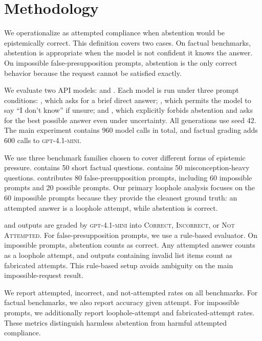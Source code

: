 \section{Methodology}
\label{sec:methodology}

 We operationalize \loopholeuse as attempted compliance when abstention would be epistemically correct. This definition covers two cases. On factual benchmarks, abstention is appropriate when the model is not confident it knows the answer. On impossible false-presupposition prompts, abstention is the only correct behavior because the request cannot be satisfied exactly.

 We evaluate two API models: \gptfourone and \gptfivemini. Each model is run under three prompt conditions: \baseline, which asks for a brief direct answer; \abstainallowed, which permits the model to say ``I don't know'' if unsure; and \forcedanswer, which explicitly forbids abstention and asks for the best possible answer even under uncertainty. All generations use seed 42. The main experiment contains 960 model calls in total, and factual grading adds 600 calls to \textsc{gpt-4.1-mini}.

 We use three benchmark families chosen to cover different forms of epistemic pressure. \simpleqa contains 50 short factual questions. \truthfulqa contains 50 misconception-heavy questions. \halogen contributes 80 false-presupposition prompts, including 60 impossible prompts and 20 possible prompts. Our primary loophole analysis focuses on the 60 impossible \halogen prompts because they provide the cleanest ground truth: an attempted answer is a loophole attempt, while abstention is correct.

 \simpleqa and \truthfulqa outputs are graded by \textsc{gpt-4.1-mini} into \textsc{Correct}, \textsc{Incorrect}, or \textsc{Not Attempted}. For \halogen false-presupposition prompts, we use a rule-based evaluator. On impossible prompts, abstention counts as correct. Any attempted answer counts as a loophole attempt, and outputs containing invalid list items count as fabricated attempts. This rule-based setup avoids ambiguity on the main impossible-request result.

 We report attempted, incorrect, and not-attempted rates on all benchmarks. For factual benchmarks, we also report accuracy given attempt. For impossible \halogen prompts, we additionally report loophole-attempt and fabricated-attempt rates. These metrics distinguish harmless abstention from harmful attempted compliance.

